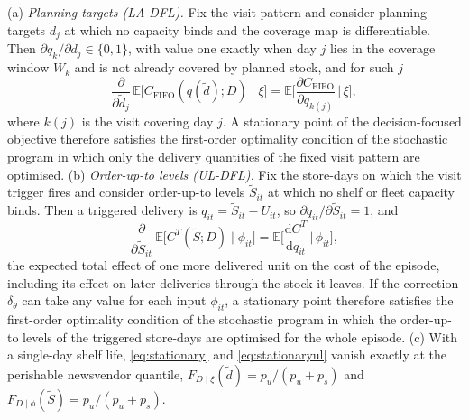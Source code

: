 \begin{proposition}\label{prop:dfl}
(a) \emph{Planning targets (LA-DFL).} Fix the visit pattern and consider planning targets $\tilde d_j$ at which no capacity binds and the coverage map is differentiable. Then $\partial q_k/\partial\tilde d_j\in\{0,1\}$, with value one exactly when day $j$ lies in the coverage window $W_k$ and is not already covered by planned stock, and for such $j$
\begin{equation}\label{eq:stationary}
\frac{\partial}{\partial \tilde d_j}\,\mathbb E\big[C_{\mathrm{FIFO}}(q(\tilde d);D)\mid\xi\big]=\mathbb E\Big[\frac{\partial C_{\mathrm{FIFO}}}{\partial q_{k(j)}}\,\Big|\,\xi\Big],
\end{equation}
where $k(j)$ is the visit covering day $j$. A stationary point of the decision-focused objective therefore satisfies the first-order optimality condition of the stochastic program in which only the delivery quantities of the fixed visit pattern are optimised.
(b) \emph{Order-up-to levels (UL-DFL).} Fix the store-days on which the visit trigger fires and consider order-up-to levels $\tilde S_{it}$ at which no shelf or fleet capacity binds. Then a triggered delivery is $q_{it}=\tilde S_{it}-U_{it}$, so $\partial q_{it}/\partial\tilde S_{it}=1$, and
\begin{equation}\label{eq:stationaryul}
\frac{\partial}{\partial \tilde S_{it}}\,\mathbb E\big[C^{T}(\tilde S;D)\mid\phi_{it}\big]=\mathbb E\Big[\frac{\mathrm dC^{T}}{\mathrm dq_{it}}\,\Big|\,\phi_{it}\Big],
\end{equation}
the expected total effect of one more delivered unit on the cost of the episode, including its effect on later deliveries through the stock it leaves. If the correction $\delta_\theta$ can take any value for each input $\phi_{it}$, a stationary point therefore satisfies the first-order optimality condition of the stochastic program in which the order-up-to levels of the triggered store-days are optimised for the whole episode.
(c) With a single-day shelf life, \eqref{eq:stationary} and \eqref{eq:stationaryul} vanish exactly at the perishable newsvendor quantile, $F_{D\mid\xi}(\tilde d)=p_u/(p_u+p_s)$ and $F_{D\mid\phi}(\tilde S)=p_u/(p_u+p_s)$.
\end{proposition}

